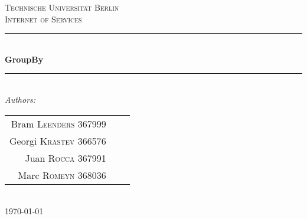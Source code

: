 %
%

\begin{titlepage}

\newcommand{\HRule}{\rule{\linewidth}{0.5mm}} %

\center %
 
\textsc{\LARGE Technische Universit\"at Berlin}\\[1.5cm] %
\textsc{\Large Internet of Services}\\[0.5cm] %

\HRule \\[0.4cm]
{ \huge \bfseries GroupBy}\\[0.4cm]


\HRule \\[1.5cm]
\Large \emph{Authors:}\\[0.5cm]

\begin{tabular}{rcl}
	Bram \textsc{Leenders} \small{367999}\\
	Georgi \textsc{Krastev} \small{366576}\\
	Juan \textsc{Rocca} \small{367991}\\
	Marc \textsc{Romeyn} \small{368036}\\
\end{tabular}
\\[3cm]

{\large \today}\\[3cm] 


\vfill %

\end{titlepage}

